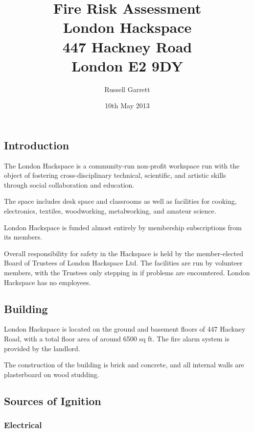 \title{Fire Risk Assessment\\
    London Hackspace \\
    447 Hackney Road\\
    London E2 9DY
}


\date{10th May 2013}

\author{Russell Garrett}

\maketitle

\subsection{Introduction}

The London Hackspace is a community-run non-profit workspace run with
the object of fostering cross-disciplinary technical, scientific, and
artistic skills through social collaboration and education.

The space includes desk space and classrooms as well as facilities for
cooking, electronics, textiles, woodworking, metalworking, and amateur
science.

London Hackspace is funded almost entirely by membership subscriptions
from its members.

Overall responsibility for safety in the Hackspace is held by the
member-elected Board of Trustees of London Hackspace Ltd. The facilities
are run by volunteer members, with the Trustees only stepping in if
problems are encountered. London Hackspace has no employees.

\subsection{Building}

London Hackspace is located on the ground and basement floors of
447 Hackney Road, with a total floor area of around 6500 sq ft.
The fire alarm system is provided by the landlord.

The construction of the building is brick and concrete, and all internal
walls are plasterboard on wood studding.

\subsection{Sources of Ignition}

\subsubsection{Electrical}

